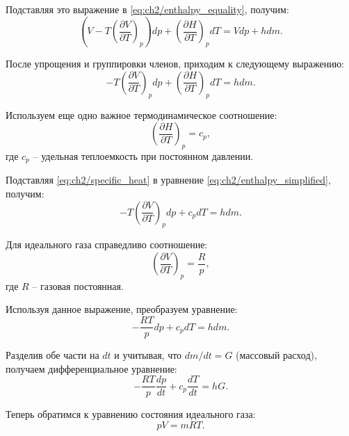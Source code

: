 Подставляя это выражение в \eqref{eq:ch2/enthalpy_equality}, получим:
\begin{equation}
\label{eq:ch2/enthalpy_substitution}
    \left( V - T \left(
        \frac{\partial V}{\partial T}
        \right)_p \right) dp + \left(
    \frac{\partial H}{\partial T}
    \right)_p dT = Vdp + hdm.
\end{equation}

После упрощения и группировки членов, приходим к следующему выражению:
\begin{equation}
\label{eq:ch2/enthalpy_simplified}
    -T \left(
    \frac{\partial V}{\partial T}
    \right)_p dp + \left(
    \frac{\partial H}{\partial T}
    \right)_p dT = hdm.
\end{equation}

Используем еще одно важное термодинамическое соотношение:
\begin{equation}
\label{eq:ch2/specific_heat}
    \left(
    \frac{\partial H}{\partial T}
    \right)_p = c_p,
\end{equation}
где $c_p$ -- удельная теплоемкость при постоянном давлении.

Подставляя \eqref{eq:ch2/specific_heat} в уравнение \eqref{eq:ch2/enthalpy_simplified}, получим:
\begin{equation}
\label{eq:ch2/enthalpy_final}
    -T \left(
    \frac{\partial V}{\partial T}
    \right)_p dp + c_p dT = hdm.
\end{equation}

Для идеального газа справедливо соотношение:
\begin{equation}
\label{eq:ch2/ideal_gas_relation}
    \left(\frac{\partial V}{\partial T}\right)_p = \frac{R}{p},
\end{equation}
где $R$ -- газовая постоянная.

Используя данное выражение, преобразуем уравнение:
\begin{equation}
\label{eq:ch2/pressure_temp_relation}
    -\frac{RT}{p} dp + c_p dT = h dm.
\end{equation}

Разделив обе части на $dt$ и учитывая, что $dm/dt = G$ (массовый расход), получаем дифференциальное уравнение:
\begin{equation}
\label{eq:ch2/differential_equation}
    -\frac{RT}{p} \frac{dp}{dt} + c_p \frac{dT}{dt} = hG.
\end{equation}

Теперь обратимся к уравнению состояния идеального газа:
\begin{equation}
\label{eq:ch2/ideal_gas_equation}
    pV = mRT.
\end{equation}

